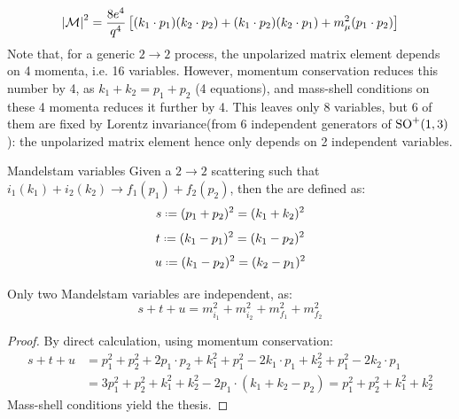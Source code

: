 \begin{equation}
  \left\lvert\mathcal{M}\right\rvert^2 = \frac{8e^4}{q^4} \left[ (k_1 \cdot p_1) (k_2 \cdot p_2) + (k_1 \cdot p_2) (k_2 \cdot p_1) + m_\mu^2 (p_1 \cdot p_2) \right]
\end{equation}
Note that, for a generic $ 2 \rightarrow 2 $ process, the unpolarized matrix element depends on 4 momenta, i.e. 16 variables. However, momentum conservation reduces this number by 4, as $ k_1 + k_2 = p_1 + p_2 $ (4 equations), and mass-shell conditions on these 4 momenta reduces it further by 4. This leaves only 8 variables, but 6 of them are fixed by Lorentz invariance\footnotemark (from 6 independent generators of $ \mathrm{SO}^+(1,3) $): the unpolarized matrix element hence only depends on 2 independent variables.


\begin{definition}{Mandelstam variables}{}
  Given a $ 2 \rightarrow 2 $ scattering such that $ i_1(k_1) + i_2(k_2) \rightarrow f_1(p_1) + f_2(p_2) $, then the  are defined as:
  \begin{equation}
    s \defeq (p_1 + p_2)^2 = (k_1 + k_2)^2
  \end{equation}
  \begin{equation}
    t \defeq (k_1 - p_1)^2 = (k_1 - p_2)^2
  \end{equation}
  \begin{equation}
    u \defeq (k_1 - p_2)^2 = (k_2 - p_1)^2
  \end{equation}
\end{definition}

\begin{proposition}{}{}
  Only two Mandelstam variables are independent, as:
  \begin{equation}
    s + t + u = m_{i_1}^2 + m_{i_2}^2 + m_{f_1}^2 + m_{f_2}^2
  \end{equation}
\end{proposition}

\begin{proofbox}
  \begin{proof}
    By direct calculation, using momentum conservation:
    \begin{equation*}
      \begin{split}
        s + t + u
        & = p_1^2 + p_2^2 + 2 p_1 \cdot p_2 + k_1^2 + p_1^2 - 2 k_1 \cdot p_1 + k_2^2 + p_1^2 - 2 k_2 \cdot p_1 \\
        & = 3p_1^2 + p_2^2 + k_1^2 + k_2^2 - 2p_1 \cdot (k_1 + k_2 - p_2) = p_1^2 + p_2^2 + k_1^2 + k_2^2
      \end{split}
    \end{equation*}
    Mass-shell conditions yield the thesis.
  \end{proof}
\end{proofbox}

